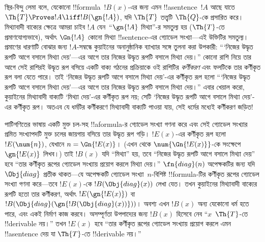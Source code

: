 \documentclass[../../../include/open-logic-section]{subfiles}
\begin{document}


\begin{explain}
স্থির-বিন্দু লেমা বলে, যেকোনো !!{formula}~$!B(x)$-এর জন্য এমন
!!a{sentence}~$!A$ আছে যাতে $\Th{T} \Proves !A \liff !B(\gn{!A})$,
যদি $\Th{T}$ তত্ত্বটি $\Th{Q}$-কে প্রসারিত করে। মিথ্যাবাদী বাক্যের
ক্ষেত্রে আমরা চাইব $!A$ যেন~``$\gn{!A}$ মিথ্যা''-র সমতুল্য হয়
($\Th{T}$-তে প্রমাণযোগ্যভাবে), অর্থাৎ $\Gn{!A}$ কোনো মিথ্যা
!!{sentence}-এর গ্যোডেল সংখ্যা—এই উক্তিটির সমতুল্য। প্রমাণের ধারণাটি
বোঝার জন্য $!A$-সম্বন্ধে কুয়াইনের অনানুষ্ঠানিক ব্যাখ্যার সঙ্গে তুলনা করা
উপকারী: ``{}`নিজের উদ্ধৃত রূপটি আগে বসালে মিথ্যা দেয়'—এর আগে তার নিজের
উদ্ধৃত রূপটি বসালে মিথ্যা দেয়।'' কোনো রাশি নিয়ে তার আগে সেই রাশিরই
উদ্ধৃত রূপ বসিয়ে একটি বাক্য গঠনের প্রক্রিয়াকে ওই রাশিটির
\emph{কর্ণীকরণ} এবং ফলটিকে তার কর্ণীকৃত রূপ বলা যেতে পারে। তাই
`নিজের উদ্ধৃত রূপটি আগে বসালে মিথ্যা দেয়'-এর কর্ণীকৃত রূপ হলো
``{}`নিজের উদ্ধৃত রূপটি আগে বসালে মিথ্যা দেয়'—এর আগে তার নিজের উদ্ধৃত
রূপটি বসালে মিথ্যা দেয়।'' এবার খেয়াল করো, কুয়াইনের মিথ্যাবাদী বাক্যটি
`মিথ্যা দেয়'-এর কর্ণীকৃত রূপ নয়; সেটি `নিজের উদ্ধৃত রূপটি আগে বসালে
মিথ্যা দেয়'-এর কর্ণীকৃত রূপ। অতএব যে ধর্মটির কর্ণীকরণে মিথ্যাবাদী বাক্যটি
পাওয়া যায়, সেই ধর্মের মধ্যেই কর্ণীকরণ জড়িত!{}

পাটিগণিতের ভাষায় একটি মুক্ত চল-সহ !!a{formula}-র গ্যোডেল সংখ্যা গণনা
করে এবং সেই গ্যোডেল সংখ্যার প্রমিত সংখ্যাপদটি মুক্ত চলের জায়গায় বসিয়ে
তার উদ্ধৃত রূপ গড়ি। $!E(x)$-এর কর্ণীকৃত রূপ হলো $!E(\num{n})$, যেখানে
$n = \Gn{!E(x)}$। (এখন থেকে $\num{\Gn{!E(x)}}$-কে সংক্ষেপে
$\gn{!E(x)}$ লিখব।) তাই $!B(x)$ যদি ``মিথ্যা'' হয়, তবে ``নিজের উদ্ধৃত
রূপটি আগে বসালে মিথ্যা দেয়'' হবে ``তার কর্ণীকৃত রূপের গ্যোডেল সংখ্যায়
প্রয়োগ করলে মিথ্যা দেয়।'' $\fn{diag}(n)$ অপেক্ষকটির জন্য যদি
$\Obj{diag}$ প্রতীক থাকত—যে অপেক্ষকটি গ্যোডেল সংখ্যা~$n$-বিশিষ্ট
!!{formula}-টির কর্ণীকৃত রূপের গ্যোডেল সংখ্যা গণনা করে—তবে $!E(x)$-কে
$!B(\Obj{diag}(x))$ লেখা যেত। তখন কুয়াইনের মিথ্যাবাদী বাক্যের রূপটি হতো
তার কর্ণীকরণ, অর্থাৎ $!E(\gn{!E(x)})$ বা
$!B(\Obj{diag}(\gn{!B(\Obj{diag}(x))}))$। অবশ্য এখন $!B(x)$ অন্য যেকোনো
ধর্ম হতে পারে, এবং একই নির্মাণ কাজ করবে। অসম্পূর্ণতা উপপাদ্যের জন্য
$!B(x)$ হিসেবে নেব ``$x$~$\Th{T}$-তে !!{derivable} নয়।'' তখন $!E(x)$
হবে ``তার কর্ণীকৃত রূপের গ্যোডেল সংখ্যায় প্রয়োগ করলে এমন
!!a{sentence} দেয় যা $\Th{T}$-তে !!{derivable} নয়।''


\end{explain}
\end{document}
